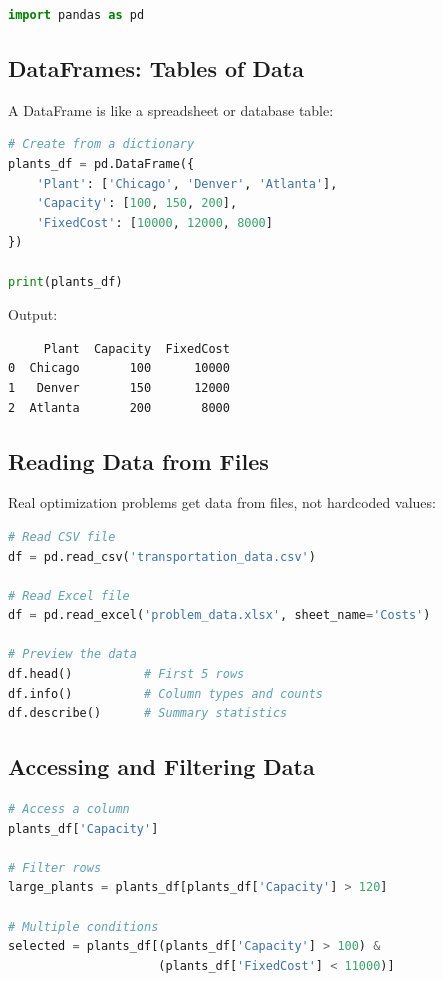 \begin{lstlisting}[language=Python]
import pandas as pd
\end{lstlisting}

\subsection{DataFrames: Tables of Data}

A DataFrame is like a spreadsheet or database table:

\begin{lstlisting}[language=Python]
# Create from a dictionary
plants_df = pd.DataFrame({
    'Plant': ['Chicago', 'Denver', 'Atlanta'],
    'Capacity': [100, 150, 200],
    'FixedCost': [10000, 12000, 8000]
})

print(plants_df)
\end{lstlisting}

Output:
\begin{verbatim}
     Plant  Capacity  FixedCost
0  Chicago       100      10000
1   Denver       150      12000
2  Atlanta       200       8000
\end{verbatim}

\subsection{Reading Data from Files}

Real optimization problems get data from files, not hardcoded values:

\begin{lstlisting}[language=Python]
# Read CSV file
df = pd.read_csv('transportation_data.csv')

# Read Excel file
df = pd.read_excel('problem_data.xlsx', sheet_name='Costs')

# Preview the data
df.head()          # First 5 rows
df.info()          # Column types and counts
df.describe()      # Summary statistics
\end{lstlisting}

\subsection{Accessing and Filtering Data}

\begin{lstlisting}[language=Python]
# Access a column
plants_df['Capacity']

# Filter rows
large_plants = plants_df[plants_df['Capacity'] > 120]

# Multiple conditions
selected = plants_df[(plants_df['Capacity'] > 100) &
                     (plants_df['FixedCost'] < 11000)]
\end{lstlisting}


